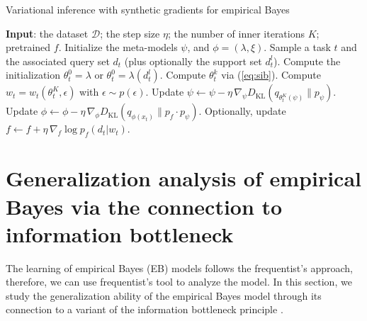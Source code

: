 \documentclass{article} \usepackage{iclr2020_conference,times}
\def\eqref#1{(\ref{#1})}
\def\gD{{\mathcal{D}}}
\newcommand{\supp}{l}
\begin{document}
\begin{algorithm}[t]
  \caption{Variational inference with synthetic gradients for empirical Bayes}
  \label{alg:sib}
  \begin{algorithmic}[1]
    \State \textbf{Input}: the dataset $\gD$; the step size $\eta$; the number of inner iterations $K$; pretrained $f$.
    \State Initialize the meta-models $\psi$, and $\phi = (\lambda, \xi)$.
      \State Sample a task $t$ and the associated query set $d_t$ (plus optionally the support set $d_t^\supp$).
      \State Compute the initialization $\theta_t^0 = \lambda$ or $\theta_t^0 = \lambda(d_t^\supp)$.
        \State Compute $\theta_t^k$ via \eqref{eq:sib}.
      \EndFor
      \State Compute $w_t = w_t(\theta_t^K, \epsilon)$ with $\epsilon \sim p(\epsilon)$.
      \State Update $\psi \leftarrow \psi - \eta \,\nabla_\psi D_\text{KL}( q_{\theta_t^K(\psi)} \| p_{\psi} )$.
      \vspace{-0.2mm}
      \State Update $\phi \leftarrow \phi - \eta \,\nabla_\phi D_\text{KL}( q_{\phi(x_t)} \| p_f \cdot p_{\psi} )$.
      \State Optionally, update $f \leftarrow f + \eta \,\nabla_f \log p_f(d_t | w_t)$.
    \EndWhile
\end{algorithmic}
\end{algorithm}














 \section{Generalization analysis of empirical Bayes via the connection to information bottleneck}
\label{sec:theory}

The learning of empirical Bayes (EB) models follows the frequentist's approach,
therefore, we can use frequentist's tool to analyze the model.
In this section, we study the generalization ability of the empirical Bayes model
through its connection to a variant of the information bottleneck principle \citet{Achille17,tishby2000information}. 
\end{document}
